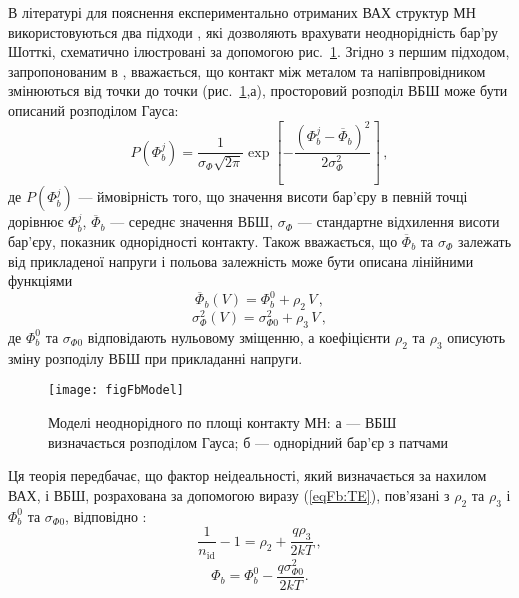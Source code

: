 В літературі для пояснення експериментально отриманих ВАХ структур МН використовуються два
підходи \cite{Sarpatwari, Tascioglu2010, Yildirim2010, Mamor, Iucolano2007JAP, Iucolano2007APL}, які дозволяють
врахувати неоднорідність бар'ру Шотткі,
схематично ілюстровані за допомогою рис.~\ref{figFbModel}.
Згідно з першим підходом, запропонованим в \cite{Werner}, вважається, що контакт між металом та напівпровідником
змінюються від точки до точки (рис.~\ref{figFbModel},а),  просторовий розподіл ВБШ  може бути описаний розподілом Гауса:
\begin{equation}\label{eqFbWerner}
  P(\Phi_{b}^j)=\frac{1}{\sigma_\Phi\sqrt{2\pi}}\exp\left[-\frac{(\Phi_{b}^j-\overline{\Phi}_{b})^2}{2\sigma_\Phi^2}\right]\,,
\end{equation}
де
$P(\Phi_{b}^j)$ --- ймовірність того, що значення висоти бар'єру в певній точці дорівнює $\Phi_{b}^j$,
$\overline{\Phi}_{b}$ --- середнє значення ВБШ,
$\sigma_\Phi$ --- стандартне відхилення висоти бар'єру, показник однорідності контакту.
Також вважається, що $\overline{\Phi}_{b}$ та $\sigma_\Phi$ залежать
від прикладеної напруги і польова залежність може бути описана лінійними функціями
\begin{equation}\label{eqFbV}
   \overline{\Phi}_{b}(V)=\Phi_{b}^0+\rho_2\,V\,,
\end{equation}
\begin{equation}\label{eqNV}
   \sigma_\Phi^2(V)=\sigma_{\Phi0}^2+\rho_3\,V\,,
\end{equation}
де
$\Phi_{b}^0$ та $\sigma_{\Phi0}$ відповідають нульовому зміщенню,
а коефіцієнти $\rho_2$ та $\rho_3$ описують зміну розподілу ВБШ при прикладанні напруги.

\begin{figure}
\center
\texttt{[image: figFbModel]}
\caption{\label{figFbModel}
Моделі неоднорідного по площі контакту МН:
а --- ВБШ визначається розподілом Гауса;
б --- однорідний бар'єр з патчами
}%
\end{figure}

Ця теорія передбачає,
що фактор неідеальності, який визначається за нахилом ВАХ, і ВБШ, розрахована за допомогою виразу (\ref{eqFb:TE}),
пов'язані з $\rho_2$ та $\rho_3$ і
$\Phi_{b}^0$ та $\sigma_{\Phi0}$, відповідно \cite{Werner,Tascioglu2010,Yildirim2010,Mamor,Soylu}:
\begin{equation}\label{eqNidT}
  \frac{1}{n_\mathrm{id}}-1=\rho_2+\frac{q\rho_3}{2kT}\,,
\end{equation}
\begin{equation}\label{eqFb0T}
\Phi_b=\Phi_b^0-\frac{q\sigma^2_{\Phi0}}{2kT}.
\end{equation}

